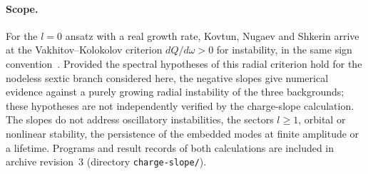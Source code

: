 \paragraph{Scope.}
For the $l=0$ ansatz with a real growth rate, Kovtun, Nugaev and
Shkerin arrive at the Vakhitov--Kolokolov criterion $dQ/d\omega>0$ for
instability, in the same sign convention~\cite{Kovtun2018,VakhitovKolokolov1973}.
Provided the spectral hypotheses of this radial criterion hold for the
nodeless sextic branch considered here, the negative slopes give
numerical evidence against a purely growing radial instability of the
three backgrounds; these hypotheses are not independently verified by
the charge-slope calculation. The slopes do not address
oscillatory instabilities, the sectors $l\ge1$, orbital or nonlinear
stability, the persistence of the embedded modes at finite amplitude or
a lifetime. Programs and result records of both calculations are
included in archive revision~3 (directory \texttt{charge-slope/}).
